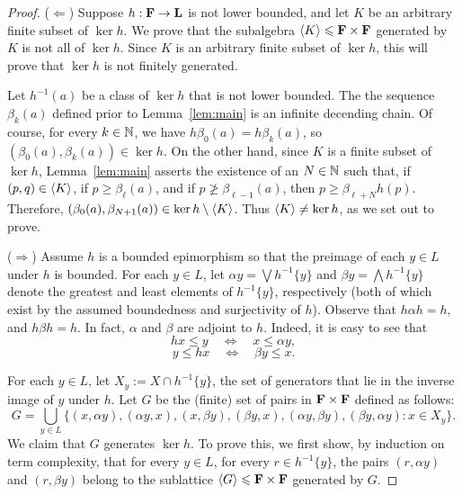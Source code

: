 \begin{proof}

  \noindent ($\Leftarrow$)
  Suppose $h: \mathbf{F} \to \mathbf{L}$ is not lower bounded, 
  and let $K$ be an arbitrary finite subset of $\ker h$.  We prove that the 
  subalgebra $\langle K\rangle\leqslant \mathbf{F} \times \mathbf{F}$ generated by $K$ is not 
  all of $\ker h$.
  Since $K$ is an arbitrary finite subset of $\ker h$, this will prove that 
  $\ker h$ is not finitely generated.

  Let $h^{-1}(a)$ be a class of $\ker h$ that is not lower bounded.
  The the sequence $\beta_k(a)$ defined prior to Lemma~\ref{lem:main}
  is an infinite decending chain.  Of course, for every $k\in \mathbb{N}$, 
  we have $h \beta_0(a) = h \beta_k(a)$, so 
  $(\beta_0(a), \beta_k(a)) \in \ker h$. 
  On the other hand, since $K$ is a finite subset of $\ker h$, 
  Lemma~\ref{lem:main} asserts the existence of 
  an $N\in \mathbb{N}$ such that, if $(p,q) \in \langle K\rangle$, if 
  $p\geq \beta_\ell(a)$, and if $p\ngeq \beta_{\ell-1}(a)$, then 
  $p\geq \beta_{\ell +N} h(p)$.
  Therefore, $(\beta_0(a), \beta_{N+1}(a)) \in \ker h \setminus \langle K\rangle$. 
  Thus $\langle K\rangle\neq \ker h$, as we set out to prove.


\medskip

  \noindent ($\Rightarrow$)
  Assume $h$ is a bounded epimorphism so that the preimage of each 
  $y\in L$ under $h$ is bounded.  For each $y\in L$, let 
  $\alpha y= \bigvee h^{-1}\{y\}$ and $\beta y = \bigwedge h^{-1}\{y\}$ 
  denote the greatest and least elements of $h^{-1}\{y\}$, respectively 
  (both of which exist by the assumed boundedness and surjectivity of $h$).  
  Observe that $h \alpha h = h$, and $h \beta h = h$. In fact, $\alpha$ 
  and $\beta$ are adjoint to $h$. Indeed, it is easy to see that
  \[
  h x \leqslant y \quad \Leftrightarrow \quad x \leqslant \alpha y,
  \]
  \[
  y \leqslant h x \quad \Leftrightarrow \quad \beta y \leqslant x.
  \]

For each $y \in L$, let $X_y := X\cap h^{-1}\{y\}$, the set of generators 
that lie in the inverse image of $y$ under $h$.
Let $G$ be the (finite) set of pairs in $\mathbf{F} \times \mathbf{F}$ defined 
as follows:
\[
G = \bigcup_{y \in L}\{(x, \alpha y), (\alpha y, x), (x, \beta y), 
                       (\beta y, x), (\alpha y, \beta y), 
                       (\beta y, \alpha y) : x \in X_y\}.
\]
We claim that $G$ generates $\ker h$.  To prove this, we first show, by 
induction on term complexity, that for every $y \in L$, for every 
$r \in h^{-1}\{y\}$, the pairs $(r,\alpha y)$ and $(r,\beta y)$ belong 
to the sublattice $\langle G \rangle \leqslant \mathbf{F} \times \mathbf{F}$ 
generated by $G$.


\end{proof}
